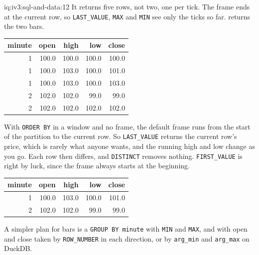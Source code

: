 \begin{solution}{iq:iv3:sql-and-data:12}
It returns five rows, not two, one per tick. The frame ends at the current row, so \texttt{LAST\_VALUE}, \texttt{MAX} and \texttt{MIN} see only the ticks so far.  returns the two bars.
\begin{center}\small
\begin{tabular}{rrrrr}
minute & open & high & low & close\\\hline
1 & 100.0 & 100.0 & 100.0 & 100.0\\
1 & 100.0 & 103.0 & 100.0 & 101.0\\
1 & 100.0 & 103.0 & 100.0 & 103.0\\
2 & 102.0 & 102.0 & 99.0 & 99.0\\
2 & 102.0 & 102.0 & 102.0 & 102.0
\end{tabular}
\end{center}
With \texttt{ORDER BY} in a window and no frame, the default frame runs from the start of the partition to the current row. So \texttt{LAST\_VALUE} returns the current row's price, which is rarely what anyone wants, and the running high and low change as you go. Each row then differs, and \texttt{DISTINCT} removes nothing. \texttt{FIRST\_VALUE} is right by luck, since the frame always starts at the beginning.
\label{lst:iv3:sq:barsfixed}
\begin{center}\small
\begin{tabular}{rrrrr}
minute & open & high & low & close\\\hline
1 & 100.0 & 103.0 & 100.0 & 101.0\\
2 & 102.0 & 102.0 & 99.0 & 99.0
\end{tabular}
\end{center}
A simpler plan for bars is a \texttt{GROUP BY minute} with \texttt{MIN} and \texttt{MAX}, and with open and close taken by \texttt{ROW\_NUMBER} in each direction, or by \texttt{arg\_min} and \texttt{arg\_max} on DuckDB.

\end{solution}

